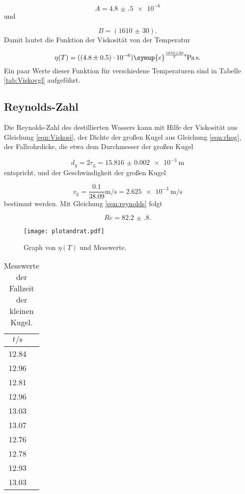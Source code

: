 \begin{equation}
  A = \num{4.8(5)e-6}
\end{equation}
und

\begin{equation}
  B = (\num{1610(30)}).
\end{equation}
Damit lautet die Funktion der Viskosität von der Temperatur

\begin{equation}
  \eta(T) = (\num{4.8(5)e-6}) \symup{e}^{\frac{\num{1610(30)}}{T}\si{\second}}
  \si{\pascal\second}.
\end{equation}
Ein paar Werte dieser Funktion für verschiedene Temperaturen sind in
Tabelle \ref{tab:Viskovgl} aufgeführt.

\subsection{Reynolds-Zahl}

Die Reynolds-Zahl des destillierten Wassers kann mit Hilfe der Viskosität aus
Gleichung \eqref{eqn:Viskosi}, der Dichte der großen Kugel aus Gleichung
\eqref{eqn:rhog},
der Fallrohrdicke, die etwa dem Durchmesser der großen Kugel

\begin{equation}
  d_\text{g} = 2 r_\text{g} = \SI{15.816(2)e-3}{\meter}
\end{equation}
entspricht, und der Geschwindigkeit der großen Kugel

\begin{equation}
  v_\text{g} = \frac{0.1}{38.09}\si{\meter\per\second} =
  \SI{2.625e-3}{\meter\per\second}
\end{equation}
bestimmt werden.
Mit Gleichung \eqref{eqn:reynolds} folgt

\begin{equation}
  Re = \num{82.2(8)}.
\end{equation}

\begin{figure}
  \centering
  \texttt{[image: plotandrat.pdf]}
  \caption{Graph von $\eta(T)$ und Messwerte.}
  \label{fig:VisTemp}
\end{figure}

\begin{table}[h]
  \centering
  \caption{Messwerte der Fallzeit der kleinen Kugel.}
  \label{tab:klKugel}
  \begin{tabular}{c c}
    \toprule
    $t/\si{\second}$ \\
    \midrule
    12.84 \\
    12.96 \\
    12.81 \\
    12.96 \\
    13.03 \\
    13.07 \\
    12.76 \\
    12.78 \\
    12.93 \\
    13.03 \\
    \bottomrule
  \end{tabular}
\end{table}

